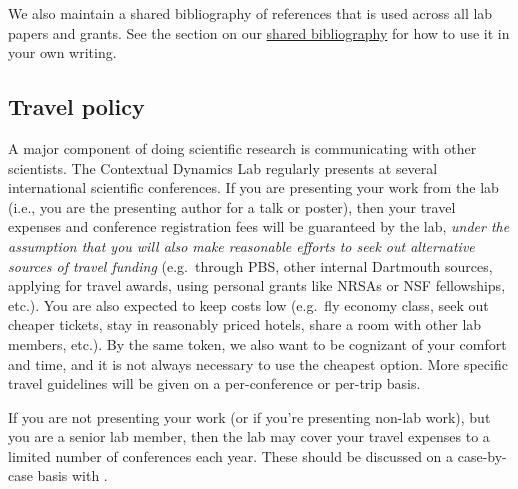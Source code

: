 \documentclass{tufte-book} %
\begin{document}
We also maintain a shared bibliography of references that is used
across all lab papers and grants.  See the section on our
\hyperref[sec:bibliography]{shared bibliography} for how to use it in
your own writing.

 \subsection{Travel policy}
 A major component of doing scientific
 research is communicating with other scientists.  The Contextual
 Dynamics Lab regularly presents at several international scientific
 conferences.  If you are presenting your work from the lab (i.e., you
 are the presenting author for a talk or poster), then your travel
 expenses and conference registration fees will be guaranteed by the
 lab, \textit{under the assumption that you will also make reasonable
   efforts to seek out alternative sources of travel funding} (e.g.\
 through PBS, other internal Dartmouth sources, applying for travel
 awards, using personal grants like NRSAs or NSF fellowships, etc.).
 You are also expected to keep costs low (e.g.\ fly economy class,
 seek out cheaper tickets, stay in reasonably priced hotels, share a
 room with other lab members, etc.).  By the same token, we also want
 to be cognizant of your comfort and time, and it is not always
 necessary to use the cheapest option.  More specific travel
 guidelines will be given on a per-conference or per-trip basis.

 If you are not presenting your work (or if you're presenting non-lab
 work), but you are a senior lab member, then the lab may cover your
 travel expenses to a limited number of conferences each year.  These
 should be discussed on a case-by-case basis with \director.
\end{document}
